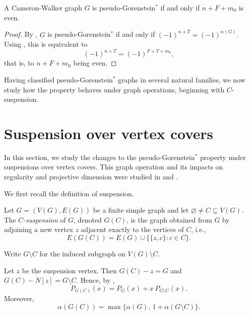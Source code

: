 \documentclass[12pt]{amsart}
\theoremstyle{plain}
\theoremstyle{definition}
\begin{document}
\begin{cor}\label{thm:CW_eval_minus_one}
A Cameron-Walker graph $G$  is pseudo-Gorenstein$^{*}$
if and only if $n+F+m_0 $ is even.
\end{cor}



\begin{proof}
By , \(G\) is pseudo-Gorenstein\(^{*}\) if and only if \((-1)^{n+T}=(-1)^{\alpha(G)}\). Using , this is equivalent to
\[
(-1)^{n+T}=(-1)^{F+T+m_0},
\]
that is, to \(n+F+m_0\) being even.
\end{proof}


Having classified pseudo-Gorenstein$^{*}$ graphs in several natural families, we now study how the property behaves under graph operations, beginning with $C$-suspension.

\section{Suspension over vertex covers}

In this section, we study the changes to the  pseudo-Gorenstein$^{*}$ property under suspensions over vertex covers.  This graph operation and its impacts on regularity and projective dimension were studied in \cite{IndMatch} and \cite{Kara_Vien_2026}. 

We first recall the definition of suspension.


\begin{defn}
Let \(G=(V(G),E(G))\) be a finite simple graph and let \(\varnothing\neq C\subseteq V(G)\).
The \emph{\(C\)-suspension} of \(G\), denoted \(G(C)\), is the graph obtained from \(G\)
by adjoining a new vertex \(z\) adjacent exactly to the vertices of \(C\), i.e.,
\[
E(G(C))=E(G)\cup \{\{z,c\}: c\in C\}.
\]
\end{defn}

Write \(G\setminus C\) for the induced subgraph on \(V(G)\setminus C\).

\begin{remark}\label{rem:C-suspension}
Let \(z\) be the suspension vertex. Then \(G(C)-z=G\) and \(G(C)-N[z]=G\setminus C\).
Hence, by ,
\begin{equation}\label{eq:C-suspension-indpoly}
P_{G(C)}(x)=P_G(x)+x\,P_{G\setminus C}(x).
\end{equation}
Moreover,
\[
\alpha(G(C))=\max\{\alpha(G),\,1+\alpha(G\setminus C)\}.
\]
\end{remark}
\end{document}

